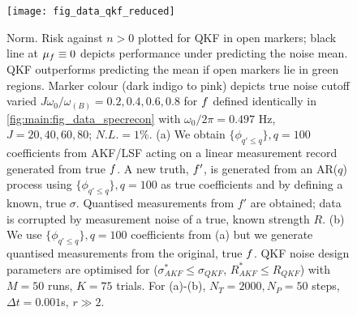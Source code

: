 \begin{figure}[h!]
    \texttt{[image: fig\_data\_qkf\_reduced]}
    \caption{\label{fig:main:fig_data_qkf2}Norm. Risk against $n>0$ plotted for QKF in open markers; black line at $\mu_f \equiv 0$ depicts performance under predicting the noise mean. QKF outperforms predicting the mean if open markers lie in green regions. Marker colour (dark indigo to pink) depicts true noise cutoff varied $J \omega_0 / \omega_{(B)} = 0.2, 0.4, 0.6, 0.8$ for $f$ defined identically in  \cref{fig:main:fig_data_specrecon} with $\omega_0/ 2\pi = 0.497 $ Hz, $J = 20, 40, 60, 80$;  $N.L. = 1 \%$. (a) We obtain $\{\phi_{q' \leq q}\}, q=100$ coefficients from AKF/LSF acting on a linear measurement record generated from true $f$. A new truth, $f'$, is generated from an AR($q$) process using $\{\phi_{q'\leq q}\}, q=100$ as true coefficients and by defining a known, true $\sigma$. Quantised measurements from $f'$ are obtained; data is corrupted by measurement noise of a true, known strength $R$. (b) We use $\{\phi_{q' \leq q} \}, q=100$ coefficients from (a) but we generate quantised measurements from the original, true $f$. QKF noise design parameters are optimised for ($\sigma_{AKF}^* \leq \sigma_{QKF}$, $R_{AKF}^* \leq R_{QKF}$) with $M=50$ runs, $K=75$ trials. For (a)-(b), $N_T = 2000, N_P = 50$ steps, $\Delta t = 0.001$s, $r\gg 2$.}
\end{figure}



